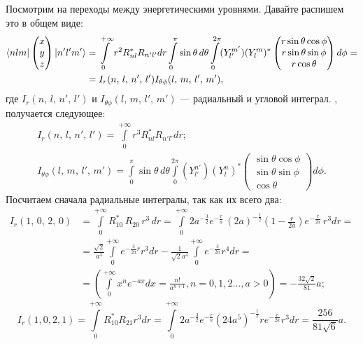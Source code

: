 Посмотрим на переходы между энергетическими уровнями. Давайте распишем это в
общем виде:
\begin{align*}
  \langle nlm\rvert\begin{pmatrix} x \\ y \\ z \end{pmatrix}\lvert n'l'm'\rangle &= \int\limits_{0}^{+\infty} r^2 R^*_{nl} R_{n'l'} dr \int\limits_{0}^{\pi}\sin\theta\,d\theta\int\limits_{0}^{2\pi}(Y^{m'}_{l'}) (Y^m_l)^* \begin{pmatrix} r\sin\theta\cos\phi \\ r\sin\theta\sin\phi \\ r\cos\theta \end{pmatrix} d\phi = \\ & = I_r(n,\,l,\,n',\,l')I_{\theta\phi}(l,\,m,\,l',\,m'),
\end{align*}
где $I_r(n,\,l,\,n',\,l')$ и $I_{\theta\phi}(l,\,m,\,l',\,m')$ --- радиальный и
угловой интеграл. \bigskip {}, получается следующее:
\begin{gather*}
  I_r(n,\,l,\,n',\,l') = \int\limits_{0}^{+\infty} r^3 R^*_{nl} R_{n'l'} dr;\\
  I_{\theta\phi}(l,\,m,\,l',\,m') = \int\limits_{0}^{\pi}\sin\theta\,d\theta\int\limits_{0}^{2\pi}(Y^{n'}_{l'}) (Y^n_l)^* \begin{pmatrix} \sin\theta\cos\phi \\ \sin\theta\sin\phi \\ \cos\theta \end{pmatrix} d\phi.
\end{gather*}
Посчитаем сначала радиальные интегралы, так как их всего два:
\begin{align*}
  I_r(1,\,0,\,2,\,0) &= \int\limits_{0}^{+\infty} R_{10}^*\,R_{20}\,r^3\,dr = \int\limits_{0}^{+\infty} 2a^{-\frac{3}{2}} e^{-\frac{r}{a}} \, (2a)^{-\frac{1}{2}} \left(1 - \frac{r}{2a}\right) e^{-\frac{r}{2a}} \, r^3 dr = \\
  & = \frac{\sqrt{2}}{a^3} \int\limits_{0}^{+\infty} e^{-\frac{3}{2a}r} r^3 dr - \frac{1}{\sqrt{2}a^4} \int\limits_{0}^{+\infty} e^{-\frac{3}{2a}} r^4 dr = \\
  & = \left(\int\limits_{0}^{+\infty} x^n e^{-ax} dx = \frac{n!}{a^{n + 1}}, n = 0, 1, 2..., a > 0\right) = -\frac{32\sqrt{2}}{81} a;
\end{align*}
\[
  I_r(1, 0, 2, 1) = \int\limits_{0}^{+\infty} R_{10}^* R_{21} r^3 dr = \int\limits_{0}^{+\infty} 2a^{-\frac{3}{2}} e^{-\frac{r}{a}} (24a^5)^{-\frac{1}{2}} r e^{-\frac{r}{2a}} r^3 dr = \frac{256}{81\sqrt{6}} a.
\]
